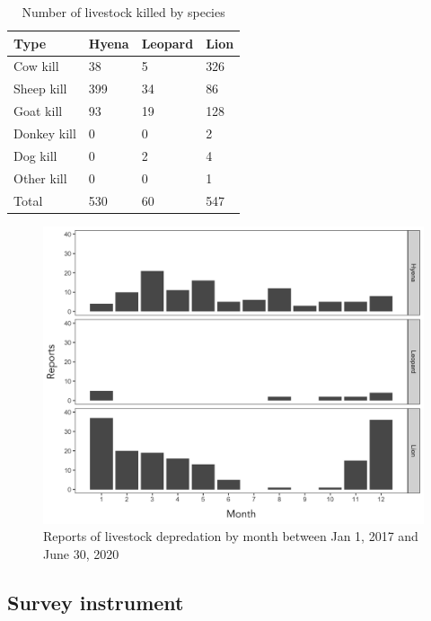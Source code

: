 \documentclass[12pt,]{article}
\begin{document}
\begin{table}[]
\caption{Number of livestock killed by species}
\centering
\begin{tabular}{llll}
\hline
\textbf{Type}        & \textbf{Hyena} & \textbf{Leopard} & \textbf{Lion} \\ \hline
Cow kill    & 38    & 5       & 326  \\
Sheep kill  & 399   & 34      & 86   \\
Goat kill   & 93    & 19      & 128  \\
Donkey kill & 0     & 0       & 2    \\
Dog kill    & 0     & 2       & 4    \\
Other kill  & 0     & 0       & 1    \\
Total       & 530   & 60      & 547  \\ \hline
\end{tabular}

\label{tab:numlivestockkilled}
\end{table}



\begin{figure}[H]
    \centering
    \includegraphics[width=\textwidth]{Figures/PredatorReports.png} 
    \caption{Reports of livestock depredation by month between Jan 1, 2017 and June 30, 2020}
    \label{fig:livestockdepredReports}
\end{figure}



\subsection{Survey instrument}
\end{document}
